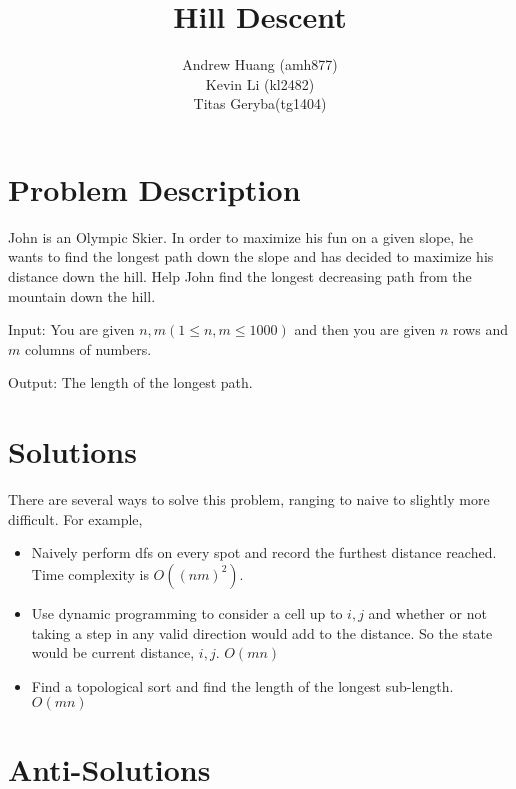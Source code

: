 \documentclass[a4paper,11pt]{article}
\title{Hill Descent}
\author{Andrew Huang (amh877) \\
Kevin Li (kl2482) \\
Titas Geryba(tg1404)}
\begin{document}
\maketitle

\section{Problem Description}

John is an Olympic Skier. In order to maximize his fun on a given slope, he wants to find the longest path down the slope and has decided to maximize his distance down the hill. Help John find the longest decreasing path from the mountain down the hill. 

Input: You are given $n, m (1 \leq n, m \leq 1000)$ and then you are given $n $ rows and $m$ columns of numbers. 

Output: The length of the longest path.



\section{Solutions}

There are several ways to solve this problem, ranging to naive to slightly more difficult.
For example,

\begin{itemize}
    \item Naively perform dfs on every spot and record the furthest distance reached. \\
Time complexity is $O((nm)^2)$.
    \item Use dynamic programming to consider a cell up to $i , j$ and whether or not taking a step in any valid direction would add to the  distance. So the state would be current distance, $i, j$. $O(mn)$
    \item Find a topological sort and find the length of the longest sub-length. $O(mn)$
\end{itemize}


\section{Anti-Solutions}

\end{document}
